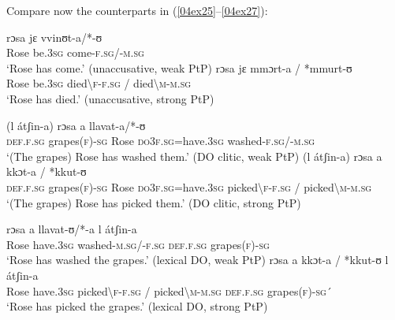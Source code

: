\documentclass[output=paper,colorlinks,citecolor=brown]{langscibook}
\begin{document}
Compare now the  counterparts in (\ref{04ex25}--\ref{04ex27}):


\noindent {}
\begin{exe}
	\ex \label{04ex25}
	\begin{xlist}
		\ex \gll rɔsa jɛ vvinʊt-a/*-ʊ \\
		Rose be.\textsc{3sg} come-\textsc{f.sg/-m.sg} \\
		\trans ‘Rose has come.’ \hfill (unaccusative, weak PtP)
		\ex \gll rɔsa jɛ mmɔrt-a / *mmurt-ʊ \\
		Rose be.\textsc{3sg} died\textbackslash \textsc{f-f.sg} / died\textbackslash \textsc{m-m.sg} \\
		\trans ‘Rose has died.’ \hfill (unaccusative, strong PtP)
	\end{xlist}
	
	\ex \label{04ex26}
	\begin{xlist}
		\ex \gll (l átʃin-a) rɔsa a llavat-a/*-ʊ \\
		\textsc{def.f.sg} grapes\textsc{(f)-sg} Rose \textsc{do3f.sg}=have.\textsc{3sg} washed-\textsc{f.sg/-m.sg} \\
		\trans ‘(The grapes) Rose has washed them.’ \hfill (DO clitic, weak PtP)
		\ex \gll (l átʃin-a) rɔsa a kkɔt-a / *kkut-ʊ \\
		\textsc{def.f.sg} grapes\textsc{(f)-sg} Rose \textsc{do3f.sg}=have.\textsc{3sg} picked\textbackslash \textsc{f-f.sg} / picked\textbackslash \textsc{m-m.sg} \\
		\trans ‘(The grapes) Rose has picked them.’ \hfill (DO clitic, strong PtP)
	\end{xlist}
	
	\ex \label{04ex27}
	\begin{xlist}
		\ex \label{04ex27a} \gll rɔsa a llavat-ʊ/*-a l átʃin-a \\
		Rose have.\textsc{3sg} washed-\textsc{m.sg/-f.sg} \textsc{def.f.sg} grapes\textsc{(f)-sg} \\
		\trans ‘Rose has washed the grapes.’ \hfill (lexical DO, weak PtP)
		\ex \label{04ex27b} \gll rɔsa a kkɔt-a / *kkut-ʊ l átʃin-a \\
		Rose have.\textsc{3sg} picked\textbackslash \textsc{f-f.sg} / picked\textbackslash \textsc{m-m.sg} \textsc{def.f.sg} grapes\textsc{(f)-sg}´ \\
		\trans ‘Rose has picked the grapes.’ \hfill (lexical DO, strong PtP)
	\end{xlist}
\end{exe}
\end{document}
